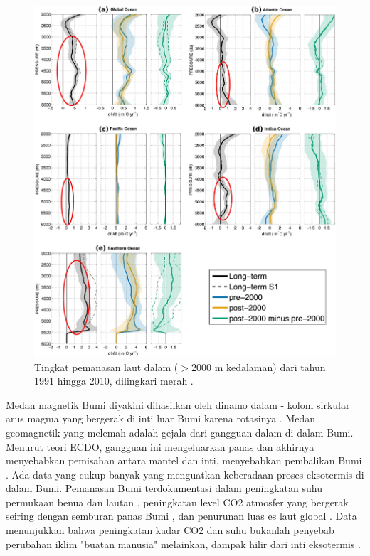 \documentclass[10pt,twocolumn,letterpaper]{article}
\begin{document}
\begin{figure}[t]
\begin{center}
   \includegraphics[width=1\linewidth]{ocean-highlight.jpg}
\end{center}
   \caption{Tingkat pemanasan laut dalam ($>$2000 m kedalaman) dari tahun 1991 hingga 2010, dilingkari merah \cite{132}.}
\label{fig:15}
\label{fig:onecol}
\end{figure}

Medan magnetik Bumi diyakini dihasilkan oleh dinamo dalam - kolom sirkular arus magma yang bergerak di inti luar Bumi karena rotasinya \cite{123}. Medan geomagnetik yang melemah adalah gejala dari gangguan dalam di dalam Bumi. Menurut teori ECDO, gangguan ini mengeluarkan panas dan akhirnya menyebabkan pemisahan antara mantel dan inti, menyebabkan pembalikan Bumi \cite{1}.
Ada data yang cukup banyak yang menguatkan keberadaan proses eksotermis di dalam Bumi. Pemanasan Bumi terdokumentasi dalam peningkatan suhu permukaan benua dan lautan \cite{127,128}, peningkatan level CO2 atmosfer yang bergerak seiring dengan semburan panas Bumi \cite{129,130}, dan penurunan luas es laut global \cite{131}. Data menunjukkan bahwa peningkatan kadar CO2 dan suhu bukanlah penyebab perubahan iklim "buatan manusia" melainkan, dampak hilir dari inti eksotermis \cite{129}.
\end{document}
